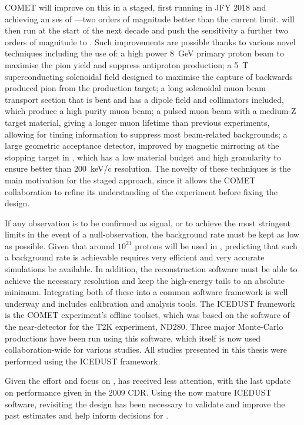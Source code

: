COMET will improve on this in a staged, first running in \ac{JFY} 2018 and achieving an \ac{ses} of \sensePI---two orders of magnitude better than the current limit.
\phaseII will then run at the start of the next decade and push the sensitivity a further two orders of magnitude to \sensePII.
Such improvements are possible thanks to various novel techniques including the use of: 
 a high power 8~GeV primary proton beam to maximise the pion yield and suppress antiproton production;
 a 5~T superconducting solenoidal field designed to maximise the capture of backwards produced pion from the production target;
 a long solenoidal muon beam transport section that is bent and has a dipole field and collimators included, which produce a high purity muon beam;
 a pulsed muon beam with a medium-Z target material, giving a longer muon lifetime than previous experiments, allowing for timing information to suppress most beam-related backgrounds;
 a large geometric acceptance detector, improved by magnetic mirroring at the stopping target in \phaseII, which has a low material budget and high granularity to ensure better than 200~keV/c resolution.
The novelty of these techniques is the main motivation for the staged approach, since it allows the COMET collaboration to refine its understanding of the experiment before fixing the \phaseII design.

If any observation is to be confirmed as signal, or to achieve the most stringent limits in the event of a null-observation, the background rate must be kept as low as possible.
Given that around $10^{21}$ protons will be used in \phaseII, predicting that such a background rate is achievable requires very efficient and very accurate simulations be available.
In addition, the reconstruction software must be able to achieve the necessary resolution and keep the high-energy tails to an absolute minimum.
Integrating both of these into a common software framework is well underway and includes calibration and analysis tools.
The ICEDUST framework is the COMET experiment's offline toolset, which was based on the software of the near-detector for the T2K experiment, ND280.
Three major Monte-Carlo productions have been run using this software, which itself is now used collaboration-wide for various studies.
All studies presented in this thesis were performed using the ICEDUST framework.

Given the effort and focus on \phaseI,  \phaseII has received less attention, with the last update on performance given in the 2009 CDR.
Using the now mature ICEDUST software, revisiting the \phaseII design has been necessary to validate and improve the past estimates and help inform decisions for \phaseI.

